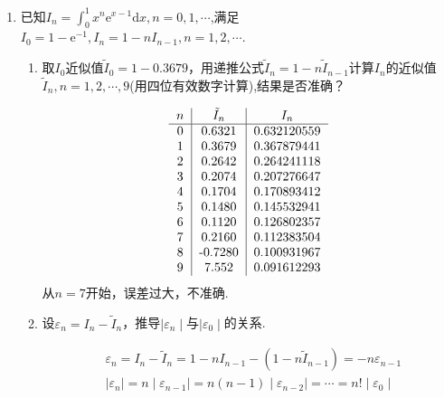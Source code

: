 \documentclass[a4paper]{article}
\begin{document}
\begin{enumerate}
  \item 已知$I_n=\int_0^1x^n\mathrm{e}^{x-1}\mathrm{d}x,n=0,1,\cdots$,满足$I_0=1-\mathrm{e}^{-1},I_n=1-nI_{n-1},n=1,2,\cdots$.
  \begin{enumerate}[label=（\arabic*）]
    \item 取$I_0$近似值$\tilde{I}_{0}=1-0.3679$，用递推公式$\tilde{I}_{n}=1-n\tilde{I}_{n-1}$计算$I_n$的近似值$\tilde{I}_n,n=1,2,\cdots ,9$(用四位有效数字计算),结果是否准确？
    \begin{solution}
      \begin{align*}
        \begin{tabular}{c|c|c} %
          $n$ & $\tilde{I}_n$ & $I_n$\\
          \hline
          0	&0.6321 	&0.632120559\\
          1	&0.3679 	&0.367879441\\
          2	&0.2642 	&0.264241118\\
          3	&0.2074 	&0.207276647\\
          4	&0.1704 	&0.170893412\\
          5	&0.1480 	&0.145532941\\
          6	&0.1120 	&0.126802357\\
          7	&0.2160 	&0.112383504\\
          8	&-0.7280 	&0.100931967\\
          9	&7.552 	&0.091612293
        \end{tabular}
      \end{align*}
      从$n=7$开始，误差过大，不准确.
    \end{solution}
    \item 设$\varepsilon_n=I_n-\tilde{I}_n$，推导$\mid\varepsilon_n\mid$与$\mid\varepsilon_0\mid$的关系.
    \begin{solution}
      \begin{align*}
        &\varepsilon_n=I_n-\tilde{I}_n=1-nI_{n-1}-(1-n\tilde{I}_{n-1})=-n\varepsilon_{n-1}\\
        &\mid\varepsilon_n\mid=n\mid\varepsilon_{n-1}\mid=n(n-1)\mid\varepsilon_{n-2}\mid=\cdots=n!\mid\varepsilon_0\mid
      \end{align*}
    \end{solution}
  \end{enumerate}

\end{enumerate}
\end{document}

